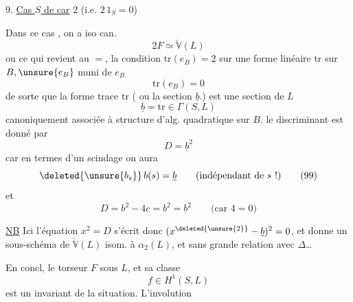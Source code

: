 9. \uline{Cas $S$ de car} 2 (i.e. $2\,1_S=0$)

Dans ce cas , on a iso can.
\[2F\simeq\check{\mathbb V}(L)\tag*{(95)}\]
ou ce qui revient au $=$, la condition $\mathrm{tr}(e_B)=2$ sur une forme linéaire $\mathrm{tr}$ sur $B,\unsure{e_B}$ muni de $e_B$  
\[\mathrm{tr}(e_B)=0\tag*{(96)}\]
de sorte que la forme trace $\mathrm{tr}$ ( ou la section $\underline b$.) est une section de $L$
\[\underline b=\mathrm{tr}\in\Gamma(S,L)\tag*{(97)}\]
canoniquement associée à  structure d'alg. quadratique sur $B$.   le discriminant est donné par
\[D=\underline b^2\tag*{(98)}\]
car en termes d'un scindage  on aura 
\[\deleted{\unsure{b_s}}\,b(s)=\underline b\qquad\text{(indépendant de $s$ !)}\tag*{(99)}\]
et
\[D=b^2-4c=b^2=\underline b^2\qquad\text{(car $4=0$)}\]

\uline{NB} Ici l'équation $x^2=D$ s'écrit donc $(x^{\deleted{\unsure{2}}}-\underline b)^2=0$, et donne un sous-schéma de $\check{\mathbb V}(L)$ isom. à $\alpha_2(L)$, et sans grande relation avec $\Delta$\ldots

En concl,  le torseur $F$ sous $L$, et sa classe
\[f\in H^1(S,L)\tag*{(100)}\]
est un  invariant de la situation. L'involution
